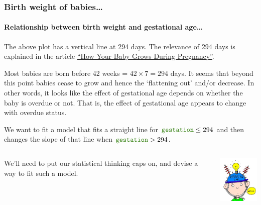 \documentclass{beamer}\usepackage[]{graphicx}\usepackage[]{xcolor}
\begin{document}
\begin{frame}[fragile]
\frametitle{Birth weight of babies\ldots}
\framesubtitle{Relationship between birth weight and gestational age\ldots}
The above plot has a vertical line at 294 days. The relevance of 294 days is explained in the article \href{https://goo.gl/k8XbSd}{\underline{``How Your Baby Grows During Pregnancy''}}.\\
\medskip

Most babies are born before 42 weeks = $42 \times 7 =294$ days. It seems that beyond this point babies cease to grow and hence the `flattening out' and/or decrease. In other words, it looks like the effect of gestational age depends on whether the baby is overdue or not. That is, the effect of gestational age appears to change with overdue status.
\bigskip

We want to fit a model that fits a straight line for $\rcode{gestation} \le 294$ and then changes the slope of that line when $\rcode{gestation}>294$.

\begin{columns}
\begin{column}{0.7\textwidth}
{\color{black} We'll need to put our statistical thinking caps on, and devise a way to fit such a model.}
\end{column}
\begin{column}{0.3\textwidth}
\includegraphics[width=1.0in]{ThinkingCap3.jpg}
\end{column}
\end{columns}

\end{frame}
\end{document}
